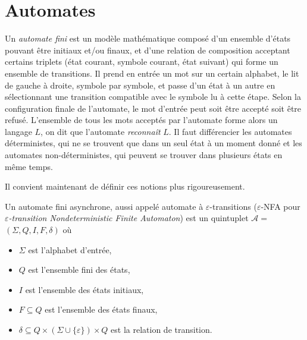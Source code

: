 \section{Automates}
\label{aut}
 
    Un \emph{automate fini} est un modèle mathématique composé d'un ensemble d'états pouvant être initiaux et/ou finaux, et d'une relation de composition acceptant certains triplets (état courant, symbole courant, état suivant) qui forme un ensemble de transitions. Il prend en entrée un mot sur un certain alphabet, le lit de gauche à droite, symbole par symbole, et passe d'un état à un autre en sélectionnant une transition compatible avec le symbole lu à cette étape. Selon la configuration finale de l'automate, le mot d'entrée peut soit être accepté soit être refusé. L'ensemble de tous les mots acceptés par l'automate forme alors un langage $L$, on dit que l'automate \emph{reconnaît} $L$.
	Il faut différencier les automates déterministes, qui ne se trouvent que dans un seul état à un moment donné et les automates non-déterministes, qui peuvent se trouver dans plusieurs états en même temps.
    
    Il convient maintenant de définir ces notions plus rigoureusement. \\
    
    \begin{definition}
		Un automate fini asynchrone, aussi appelé automate à $\varepsilon$-transitions ($\varepsilon$-NFA pour \emph{$\varepsilon$-transition Nondeterministic Finite Automaton}) est un quintuplet $\mathscr{A} =$ $(\Sigma,Q,I,F,\delta)$ où
		
		\begin{itemize}
			\item $\Sigma$ est l'alphabet d'entrée,
			\item $Q$ est l'ensemble fini des états,
			\item $I$ est l'ensemble des états initiaux,
			\item $F \subseteq Q$ est l'ensemble des états finaux,
			\item $\delta \subseteq Q \times (\Sigma \cup \{\varepsilon\}) \times Q$ est la relation de transition.
		\end{itemize}
	\end{definition}
	
